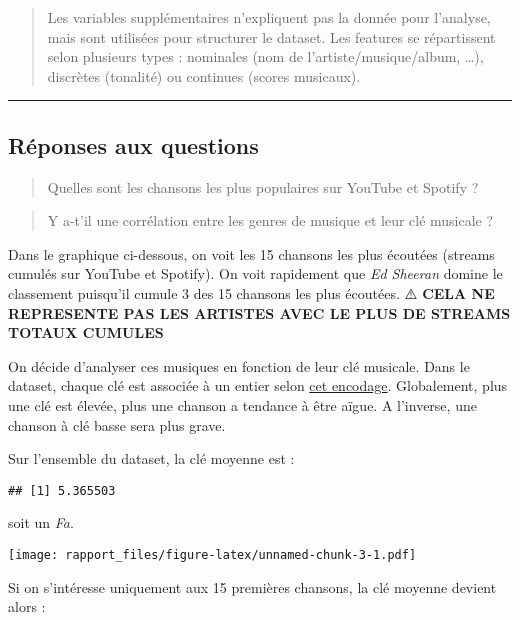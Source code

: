 \documentclass[
]{article}
\begin{document}
\begin{quote}
Les variables supplémentaires n'expliquent pas la donnée pour l'analyse,
mais sont utilisées pour structurer le dataset. Les features se
répartissent selon plusieurs types : nominales (nom de
l'artiste/musique/album, \ldots), discrètes (tonalité) ou continues
(scores musicaux).
\end{quote}

\begin{center}\rule{0.5\linewidth}{0.5pt}\end{center}

\hypertarget{ruxe9ponses-aux-questions}{%
\subsection{Réponses aux questions 🤔}\label{ruxe9ponses-aux-questions}}

\begin{quote}
Quelles sont les chansons les plus populaires sur YouTube et Spotify ?
\end{quote}

\begin{quote}
Y a-t'il une corrélation entre les genres de musique et leur clé
musicale ?
\end{quote}

Dans le graphique ci-dessous, on voit les 15 chansons les plus écoutées
(streams cumulés sur YouTube et Spotify). On voit rapidement que
\emph{Ed Sheeran} domine le classement puisqu'il cumule 3 des 15
chansons les plus écoutées. ⚠️ \textbf{CELA NE REPRESENTE PAS LES
ARTISTES AVEC LE PLUS DE STREAMS TOTAUX CUMULES}

On décide d'analyser ces musiques en fonction de leur clé musicale. Dans
le dataset, chaque clé est associée à un entier selon
\href{https://en.wikipedia.org/wiki/Pitch_class\#:~:text=\%5Bedit\%5D-,Pitch\%20class,-Pitch\%0Aclass}{cet
encodage}. Globalement, plus une clé est élevée, plus une chanson a
tendance à être aïgue. A l'inverse, une chanson à clé basse sera plus
grave.

Sur l'ensemble du dataset, la clé moyenne est :

\begin{verbatim}
## [1] 5.365503
\end{verbatim}

soit un \emph{Fa}.

\texttt{[image: rapport\_files/figure-latex/unnamed-chunk-3-1.pdf]}

Si on s'intéresse uniquement aux 15 premières chansons, la clé moyenne
devient alors :
\end{document}
